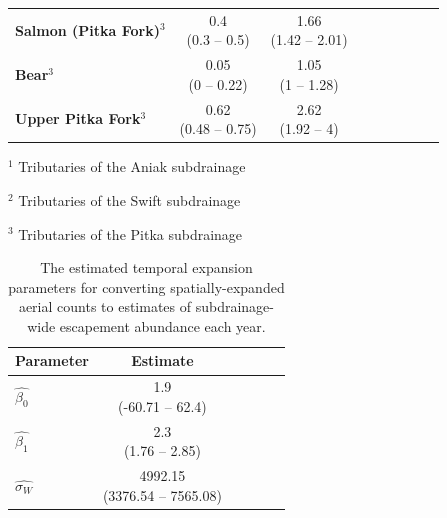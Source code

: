 \documentclass[12pt,]{book}
\theoremstyle{definition}
\theoremstyle{definition}
\theoremstyle{definition}
\theoremstyle{remark}
\begin{document}
\begin{table}[H]
\begin{tabular}[t]{>{\bfseries}lcclcclcc}
Salmon (Pitka Fork)$^3$ & \makecell[c]{0.4\\(0.3 -- 0.5)} & \makecell[c]{1.66\\(1.42 -- 2.01)}\\
\addlinespace
Bear$^3$ & \makecell[c]{0.05\\(0 -- 0.22)} & \makecell[c]{1.05\\(1 -- 1.28)}\\
Upper Pitka Fork$^3$ & \makecell[c]{0.62\\(0.48 -- 0.75)} & \makecell[c]{2.62\\(1.92 -- 4)}\\
\bottomrule
\end{tabular}
\end{table}

\(^1\) Tributaries of the Aniak subdrainage

\(^2\) Tributaries of the Swift subdrainage

\(^3\) Tributaries of the Pitka subdrainage

\begin{table}[H]

\caption{\label{tab:temp-expand-table}The estimated temporal expansion parameters for converting spatially-expanded aerial counts to estimates of subdrainage-wide escapement abundance each year.}
\centering
\begin{tabular}[t]{lcclcc}
\toprule
\textbf{Parameter} & \textbf{Estimate}\\
\midrule
$\hat{\beta_0}$ & \makecell[c]{1.9\\(-60.71 -- 62.4)}\\
$\hat{\beta_1}$ & \makecell[c]{2.3\\(1.76 -- 2.85)}\\
$\hat{\sigma_W}$ & \makecell[c]{4992.15\\(3376.54 -- 7565.08)}\\
\bottomrule
\end{tabular}
\end{table}

\clearpage
\end{document}
